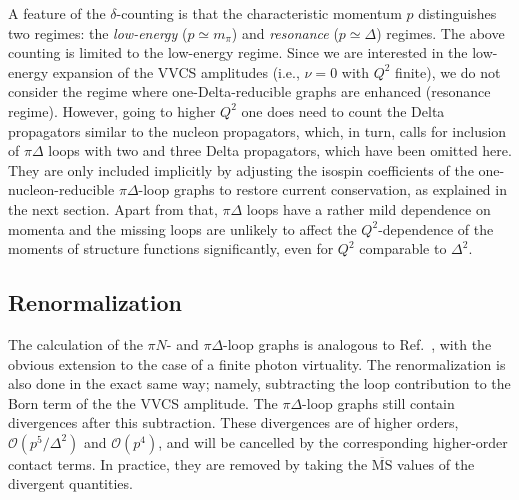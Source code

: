 \documentclass[12pt,preprint,tightenlines,
showpacs,preprintnumbers,amsmath,amssymb,
a4paper,nofootinbib]{revtex4-1}
\begin{document}
A feature of the $\delta$-counting is that the characteristic momentum
$p$ distinguishes two regimes: the {\it low-energy} ($p\simeq m_\pi$) and 
{\it resonance} ($p\simeq \varDelta$) regimes. The above counting is limited to the 
low-energy regime.
Since we are interested in the low-energy expansion of the  VVCS amplitudes (i.e., $\nu=0$ with $Q^2$ finite),
we do not consider the regime where one-Delta-reducible graphs are enhanced (resonance regime).
However, going to higher $Q^2$ one does need to count the 
Delta propagators similar to the nucleon propagators, which, in turn, calls for inclusion
of $\pi \Delta$ loops with two and three Delta propagators, which have been omitted here. They are only included implicitly 
 by adjusting the isospin coefficients of the one-nucleon-reducible $\pi \Delta$-loop graphs to restore current conservation, as explained in the next section. Apart from that, $\pi \Delta$ loops have a rather mild
dependence on momenta and the missing loops are unlikely to  affect the
$Q^2$-dependence of the moments of structure functions significantly, even for $Q^2$ comparable to $\varDelta^2$. 








\subsection{Renormalization}

The calculation of the $\pi N$- and $\pi\Delta$-loop graphs is analogous to Ref.~\cite{Lensky:2009uv}, with the obvious extension to the case of a finite photon virtuality. The renormalization is also done in the exact same way; 
namely, 
subtracting the loop contribution to the Born term of the the VVCS amplitude.
The $\pi \Delta$-loop graphs
still contain divergences after this subtraction. These divergences are of higher orders, $\mathcal{O}(p^5/\varDelta^2)$ and  $\mathcal{O}(p^4)$,
and will be cancelled by the corresponding higher-order
contact terms. In practice, they are removed by taking the $\overline{\text{MS}}$ values of the divergent quantities.
\end{document}
